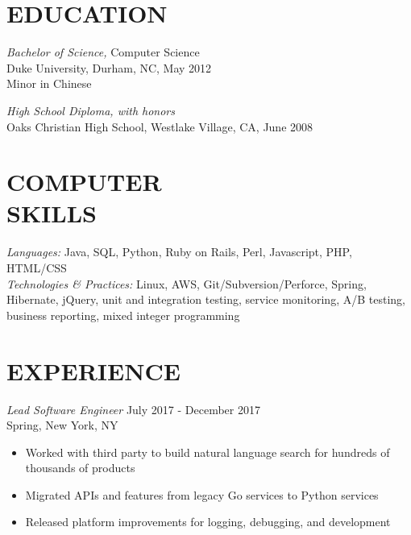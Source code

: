 \documentclass[line,margin]{res}
\begin{document}
    \setlength{\pdfpageheight}{\paperheight}
    \setlength{\pdfpagewidth}{\paperwidth}
\address{414 W. 22nd St. Apt. 17, New York, NY 10011}
\address{alex@galonsky.com}

 
\begin{resume}
\section{EDUCATION} 
    {\sl Bachelor of Science,} Computer Science \\
    Duke University, Durham, NC, 
    May 2012 \\
    Minor in Chinese

    {\sl High School Diploma, with honors} \\
    Oaks Christian High School, Westlake Village, CA, June 2008
 
\section{COMPUTER \\ SKILLS} 
    {\sl Languages:} Java, SQL, Python, Ruby on Rails, Perl, Javascript, PHP, HTML/CSS \\
    {\sl Technologies \& Practices:} Linux, AWS, Git/Subversion/Perforce, Spring, Hibernate, jQuery, unit and integration testing, service monitoring, A/B testing, business reporting, mixed integer programming
 
\section{EXPERIENCE}

    {\sl Lead Software Engineer} \hfill July 2017 - December 2017 \\
        Spring, New York, NY
        \begin{itemize}  \itemsep -2pt %
            \item Worked with third party to build natural language search for hundreds of thousands of products
            \item Migrated APIs and features from legacy Go services to Python services
            \item Released platform improvements for logging, debugging, and development
        \end{itemize}


\end{resume}
\end{document}
